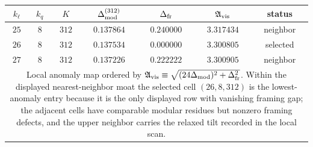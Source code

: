\begin{tabular}{|c|c|c|c|c|c|c|}
\hline
$k_{\ell}$ & $k_q$ & $K$ & $\Delta_{\rm mod}^{(312)}$ & $\Delta_{\rm fr}$ & $\mathfrak A_{\rm vis}$ & status \\
\hline
$25$ & $8$ & $312$ & $0.137864$ & $0.240000$ & $3.317434$ & neighbor \\
$26$ & $8$ & $312$ & $0.137534$ & $0.000000$ & $3.300805$ & selected \\
$27$ & $8$ & $312$ & $0.137226$ & $0.222222$ & $3.300905$ & neighbor \\
\hline
\multicolumn{7}{|p{0.87\textwidth}|}{\footnotesize Local anomaly map ordered by $\mathfrak A_{\rm vis}\equiv\sqrt{(24\Delta_{\rm mod})^2+\Delta_{\rm fr}^2}$. Within the displayed nearest-neighbor moat the selected cell $(26,8,312)$ is the lowest-anomaly entry because it is the only displayed row with vanishing framing gap; the adjacent cells have comparable modular residues but nonzero framing defects, and the upper neighbor carries the relaxed tilt recorded in the local scan.} \\
\hline
\end{tabular}
